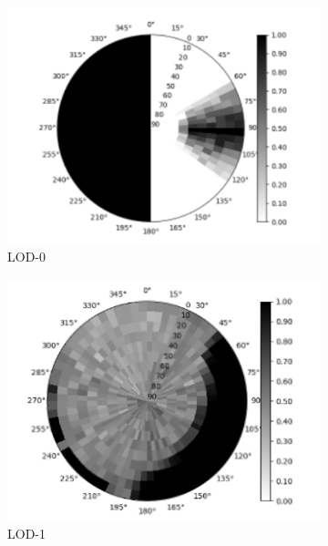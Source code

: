 \documentclass[runningheads]{llncs}
\begin{document}
\begin{figure}[htbp]
\centering
\begin{subfigure}{.4\textwidth}
  \centering
  \includegraphics[width=\linewidth]{images/solar-masks-east-facing.png}
  \caption{LOD-0}
  \label{fig:sm-building-east}
\end{subfigure}%
\begin{subfigure}{.4\textwidth}
  \centering
  \includegraphics[width=\linewidth]{images/solar-masks-whole-building.png}
  \caption{LOD-1}
  \label{fig:sm-whole-building}
\end{subfigure}
\begin{subfigure}{.4\textwidth}
  \centering

\end{subfigure}
\end{figure}
\end{document}
